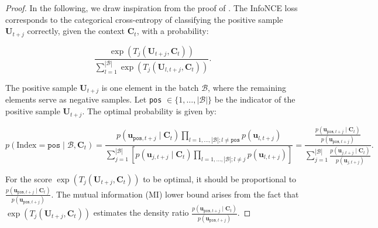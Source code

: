 \documentclass{article}
\theoremstyle{plain}
\theoremstyle{definition}
\theoremstyle{remark}
\begin{document}
\begin{proof}

In the following, we draw inspiration from the proof of \cite{oord2018representation}. The InfoNCE loss corresponds to the categorical cross-entropy of classifying the positive sample \( \mathbf{U}_{t+j} \) correctly, given the context \( \mathbf{C}_t \), with a probability:

\[
\frac{\exp(T_j(\mathbf{U}_{t+j},\mathbf{C}_{t}))}{ \sum_{l = 1}^{|\mathcal{B}|} \exp(T_j(\mathbf{U}_{l,t+j},\mathbf{C}_{t}))}.
\]

The positive sample \( \mathbf{U}_{t+j} \) is one element in the batch \( \mathcal{B} \), where the remaining elements serve as negative samples. Let \texttt{pos} \( \in \{1, \dots, |\mathcal{B}|\} \) be the indicator of the positive sample \( \mathbf{U}_{t+j} \). The optimal probability is given by:

\[
p(\text{Index} = \texttt{pos} \mid \mathcal{B}, \mathbf{C}_t) 
= \frac{p(\mathbf{u}_{\texttt{pos}, t+j} \mid \mathbf{C}_t) \prod_{l=1,\dots,|\mathcal{B}|; l \neq \texttt{pos}} p(\mathbf{u}_{l, t+j})}{\sum_{j=1}^{|\mathcal{B}|} \left[ p(\mathbf{u}_{j, t+j} \mid \mathbf{C}_t) \prod_{l=1,\dots,|\mathcal{B}|; l \neq j} p(\mathbf{u}_{l, t+j}) \right]}
= \frac{ \frac{p(\mathbf{u}_{\texttt{pos}, t+j} \mid \mathbf{C}_t)}{p(\mathbf{u}_{\texttt{pos}, t+j})} }{ \sum_{j=1}^{|\mathcal{B}|} \frac{p(\mathbf{u}_{j, t+j} \mid \mathbf{C}_t)}{p(\mathbf{u}_{j, t+j})} }.
\]

For the score \( \exp(T_j(\mathbf{U}_{t+j},\mathbf{C}_{t})) \) to be optimal, it should be proportional to \( \frac{p(\mathbf{u}_{\texttt{pos}, t+j} \mid \mathbf{C}_t)}{p(\mathbf{u}_{\texttt{pos}, t+j})} \). The mutual information (MI) lower bound arises from the fact that \( \exp(T_j(\mathbf{U}_{t+j},\mathbf{C}_{t})) \) estimates the density ratio \( \frac{p(\mathbf{u}_{\texttt{pos}, t+j} \mid \mathbf{C}_t)}{p(\mathbf{u}_{\texttt{pos}, t+j})} \).


\end{proof}
\end{document}
